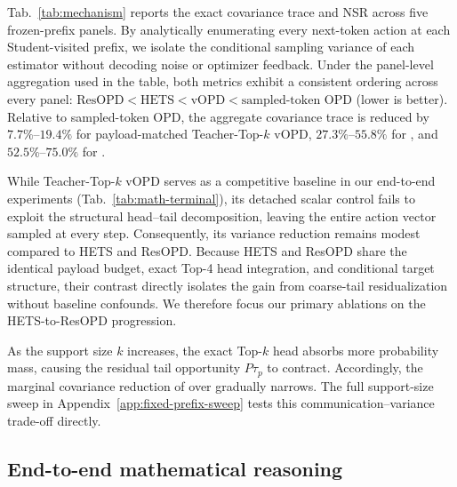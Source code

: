 Tab.~\ref{tab:mechanism} reports the exact covariance trace and NSR across five frozen-prefix panels. By analytically enumerating every next-token action at each Student-visited prefix, we isolate the conditional sampling variance of each estimator without decoding noise or optimizer feedback. Under the panel-level aggregation used in the table, both metrics exhibit a consistent ordering across every panel: $\text{ResOPD} < \text{HETS} < \text{vOPD} < \text{sampled-token OPD}$ (lower is better). Relative to sampled-token OPD, the aggregate covariance trace is reduced by $7.7\%\text{--}19.4\%$ for payload-matched Teacher-Top-$k$ vOPD, $27.3\%\text{--}55.8\%$ for \gzero{}, and $52.5\%\text{--}75.0\%$ for \method{}.

While Teacher-Top-$k$ vOPD serves as a competitive baseline in our end-to-end experiments (Tab.~\ref{tab:math-terminal}), its detached scalar control fails to exploit the structural head--tail decomposition, leaving the entire action vector sampled at every step. Consequently, its variance reduction remains modest compared to HETS and ResOPD. Because HETS and ResOPD share the identical payload budget, exact Top-4 head integration, and conditional target structure, their contrast directly isolates the gain from coarse-tail residualization without baseline confounds. We therefore focus our primary ablations on the HETS-to-ResOPD progression.

As the support size $k$ increases, the exact Top-$k$ head absorbs more probability mass, causing the residual tail opportunity $P\tau_p$ to contract. Accordingly, the marginal covariance reduction of \method{} over \gzero{} gradually narrows. The full support-size sweep in Appendix~\ref{app:fixed-prefix-sweep} tests this communication--variance trade-off directly.

\subsection{End-to-end mathematical reasoning}
\label{sec:math-opd}

